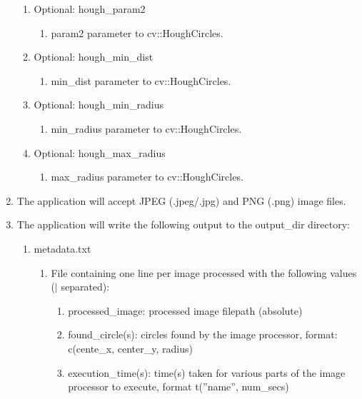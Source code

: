 \documentclass[10pt, onecolumn, draftclsnofoot, letterpaper, compsoc]{IEEEtran}
\begin{document}
\begin{enumerate}
\begin{enumerate}
            \item Optional: hough\_param2
		 		\begin{enumerate}
		 			\item param2 parameter to cv::HoughCircles.
		 		\end{enumerate}

            \item Optional: hough\_min\_dist
		 		\begin{enumerate}
		 			\item min\_dist parameter to cv::HoughCircles.
		 		\end{enumerate}

            \item Optional: hough\_min\_radius
		 		\begin{enumerate}
		 			\item min\_radius parameter to cv::HoughCircles.
		 		\end{enumerate}

            \item Optional: hough\_max\_radius
		 		\begin{enumerate}
		 			\item max\_radius parameter to cv::HoughCircles.
		 		\end{enumerate}
		 \end{enumerate}

		 \item The application will accept JPEG (.jpeg/.jpg) and PNG (.png)
		 image files.

		 \item The application will write the following output to the
		 output\_dir directory:
		 \begin{enumerate}
		 	\item metadata.txt
		 	\begin{enumerate}
		 		\item File containing one line per image processed with the
		 		following values ($\vert$  separated):
		 		\begin{enumerate}
                    \item processed\_image: processed image filepath (absolute)

                    \item found\_circle(s): circles found by the image processor, format:
                        c(cente\_x, center\_y, radius)

                    \item execution\_time(s): time(s) taken for various parts of the image
                    processor to execute, format t(''name'', num\_secs)


\end{enumerate}
\end{enumerate}
\end{enumerate}
\end{enumerate}
\end{document}
